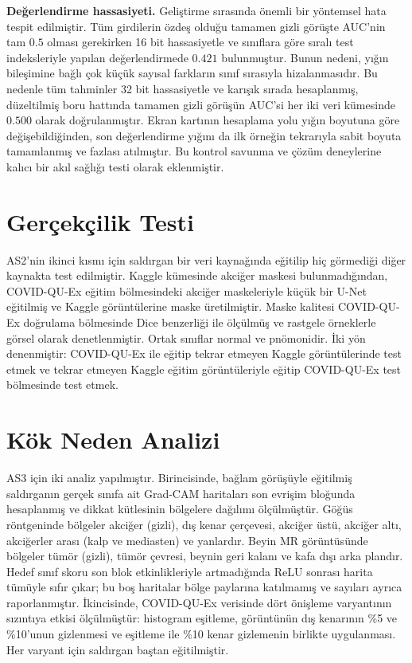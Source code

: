 \textbf{Değerlendirme hassasiyeti.} Geliştirme sırasında önemli bir yöntemsel hata tespit edilmiştir. Tüm girdilerin özdeş olduğu tamamen gizli görüşte AUC'nin tam $0.5$ olması gerekirken 16 bit hassasiyetle ve sınıflara göre sıralı test indeksleriyle yapılan değerlendirmede $0.421$ bulunmuştur. Bunun nedeni, yığın bileşimine bağlı çok küçük sayısal farkların sınıf sırasıyla hizalanmasıdır. Bu nedenle tüm tahminler 32 bit hassasiyetle ve karışık sırada hesaplanmış, düzeltilmiş boru hattında tamamen gizli görüşün AUC'si her iki veri kümesinde $0.500$ olarak doğrulanmıştır. Ekran kartının hesaplama yolu yığın boyutuna göre değişebildiğinden, son değerlendirme yığını da ilk örneğin tekrarıyla sabit boyuta tamamlanmış ve fazlası atılmıştır. Bu kontrol savunma ve çözüm deneylerine kalıcı bir akıl sağlığı testi olarak eklenmiştir.

\section{Gerçekçilik Testi}\label{sec:transfer}

AS2'nin ikinci kısmı için saldırgan bir veri kaynağında eğitilip hiç görmediği diğer kaynakta test edilmiştir. Kaggle kümesinde akciğer maskesi bulunmadığından, COVID-QU-Ex eğitim bölmesindeki akciğer maskeleriyle küçük bir U-Net \cite{ronneberger2015unet} eğitilmiş ve Kaggle görüntülerine maske üretilmiştir. Maske kalitesi COVID-QU-Ex doğrulama bölmesinde Dice benzerliği ile ölçülmüş ve rastgele örneklerle görsel olarak denetlenmiştir. Ortak sınıflar normal ve pnömonidir. İki yön denenmiştir: COVID-QU-Ex ile eğitip tekrar etmeyen Kaggle görüntülerinde test etmek ve tekrar etmeyen Kaggle eğitim görüntüleriyle eğitip COVID-QU-Ex test bölmesinde test etmek.

\section{Kök Neden Analizi}\label{sec:rootcause}

AS3 için iki analiz yapılmıştır. Birincisinde, bağlam görüşüyle eğitilmiş saldırganın gerçek sınıfa ait Grad-CAM \cite{selvaraju2017gradcam} haritaları son evrişim bloğunda hesaplanmış ve dikkat kütlesinin bölgelere dağılımı ölçülmüştür. Göğüs röntgeninde bölgeler akciğer (gizli), dış kenar çerçevesi, akciğer üstü, akciğer altı, akciğerler arası (kalp ve mediasten) ve yanlardır. Beyin MR görüntüsünde bölgeler tümör (gizli), tümör çevresi, beynin geri kalanı ve kafa dışı arka plandır. Hedef sınıf skoru son blok etkinlikleriyle artmadığında ReLU sonrası harita tümüyle sıfır çıkar; bu boş haritalar bölge paylarına katılmamış ve sayıları ayrıca raporlanmıştır. İkincisinde, COVID-QU-Ex verisinde dört önişleme varyantının sızıntıya etkisi ölçülmüştür: histogram eşitleme, görüntünün dış kenarının \%5 ve \%10'unun gizlenmesi ve eşitleme ile \%10 kenar gizlemenin birlikte uygulanması. Her varyant için saldırgan baştan eğitilmiştir.

